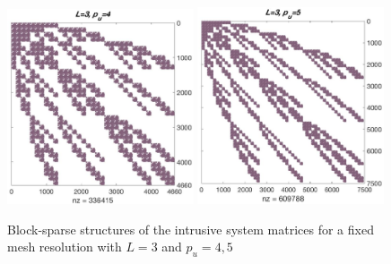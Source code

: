 \documentclass[letter,1p,11pt,oneside,onecolumn,sort&compress]{elsarticle}
\begin{document}
\begin{figure}[htbp]
\centering
 \includegraphics[width=0.49\textwidth,height=0.26\textheight]{plots/L3p4.eps}
 \includegraphics[width=0.49\textwidth,height=0.26\textheight]{plots/L3p5.eps}
 \caption{Block-sparse structures of the intrusive system matrices for a fixed mesh resolution with $L=3$ and $p_{u}=4,5$}
 \label{fig:sFEMord}
\end{figure}
\end{document}

